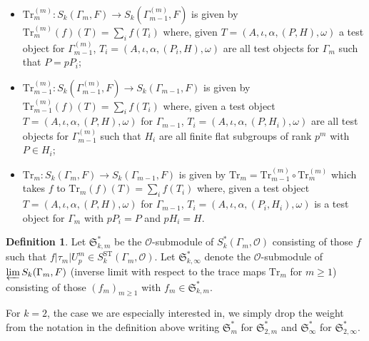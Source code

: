 \documentclass[a4paper,11pt]{amsart}
\numberwithin{equation}{section}
\theoremstyle{plain}
\theoremstyle{definition}
\newtheorem{definition}[theorem]{Definition}
\theoremstyle{remark}
\newcommand{\ST}{\mathrm{ST}}
\newcommand{\invlim}{\mathop{\varprojlim}\limits}
\begin{document}
\begin{itemize}
\item $\mathrm{Tr}_m^{(m)}\colon S_k(\Gamma_m,F)\rightarrow S_k(\Gamma_{m-1}^{(m)},F)$ is given by $\mathrm{Tr}_m^{(m)}(f)(T)=\sum_i f(T_i)$ where, given $T=(A,\iota,\alpha,(P,H),\omega)$ a test object for $\Gamma_{m-1}^{(m)}$, $T_i=(A,\iota,\alpha,(P_i,H),\omega)$ are all test objects for $\Gamma_m$ such that $P=pP_i$;

\item $\mathrm{Tr}_{m-1}^{(m)}\colon S_k(\Gamma_{m-1}^{(m)},F)\rightarrow S_k(\Gamma_{m-1},F)$ is given by $\mathrm{Tr}_{m-1}^{(m)}(f)(T)=\sum_i f(T_i)$ where, given a test object $T=(A,\iota,\alpha,(P,H),\omega)$ for $\Gamma_{m-1}$, $T_i=(A,\iota,\alpha,(P,H_i),\omega)$ are all test objects for $\Gamma_{m-1}^{(m)}$ such that $H_i$ are all finite flat subgroups of rank $p^m$ with $P\in H_i$;

\item $\mathrm{Tr}_m\colon  S_k(\Gamma_m,F)\rightarrow S_k(\Gamma_{m-1},F)$ is given by $\mathrm{Tr}_m=\mathrm{Tr}_{m-1}^{(m)}\circ \mathrm{Tr}_m^{(m)}$ which 
takes $f$ to $\mathrm{Tr}_m(f)(T)=\sum_if(T_i)$ where, given a test object $T=(A,\iota,\alpha,(P,H),\omega)$ for $\Gamma_{m-1}$, $T_i=(A,\iota,\alpha,(P_i,H_i),\omega)$ is a test object for $\Gamma_{m}$ with $pP_i=P$ and $pH_i=H$.
\end{itemize}

\begin{definition}\label{DEFINT} Let $\mathfrak{S}_{k,m}^*$ be the $\mathcal{O}$-submodule of $S_k^*(\Gamma_m,\mathcal{O})$ consisting of those $f$ such that $f|\tau_m| U_p^m\in S_k^\ST(\Gamma_m,\mathcal{O})$. Let $\mathfrak{S}_{k,\infty}^* $ denote the $\mathcal{O}$-submodule of $\invlim S_k(\Gamma_m,F)$ (inverse limit with respect to the trace maps $\mathrm{Tr}_m$ for $m\geq 1$) consisting of those $(f_m)_{m\geq 1}$ with $f_m\in \mathfrak{S}_{k,m}^*$. 
\end{definition}

For $k=2$, the case we are especially interested in, we simply drop the weight from the notation in the definition above writing $\mathfrak{S}^*_{m}$ for $\mathfrak{S}^*_{2,m}$ and $\mathfrak{S}^*_{\infty}$ for $\mathfrak{S}^*_{2,\infty}$.
\end{document}
